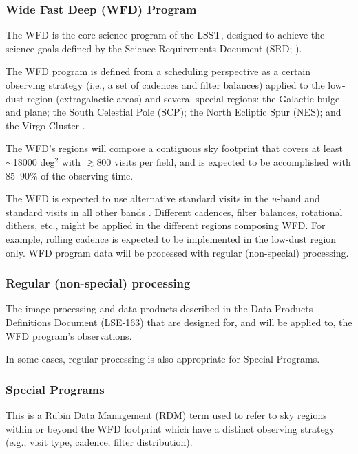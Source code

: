 \subsubsection{Wide Fast Deep (WFD) Program}

The WFD is the core science program of the LSST, designed to achieve the science 
goals defined by the Science Requirements Document (SRD; ).

The WFD program is defined from a scheduling perspective as a certain observing strategy
(i.e., a set of cadences and filter balances) applied to the low-dust region 
(extragalactic areas) and several special regions:
the Galactic bulge and plane; the South Celestial Pole (SCP); the North Ecliptic Spur (NES);
and the Virgo Cluster .

The WFD's regions will compose a contiguous sky footprint that covers at 
least $\sim$18000 deg$^2$ with $\gtrsim$800 visits per field, 
and is expected to be accomplished with 85--90\% of the observing time.

The WFD is expected to use alternative standard visits in the $u$-band and 
standard visits in all other bands .
Different cadences, filter balances, rotational dithers, etc., might
be applied in the different regions composing WFD.
For example, rolling cadence is expected to be implemented in the low-dust region only.
WFD program data will be processed with regular (non-special) processing.

\subsubsection{Regular (non-special) processing}

The image processing and data products described in the Data Products Definitions Document
(LSE-163) that are designed for, and will be applied to, the WFD program's observations.

In some cases, regular processing is also appropriate for Special Programs.

\subsubsection{Special Programs} 

This is a Rubin Data Management (RDM) term used to refer to sky regions within
or beyond the WFD footprint which have a distinct observing strategy
(e.g., visit type, cadence, filter distribution).

